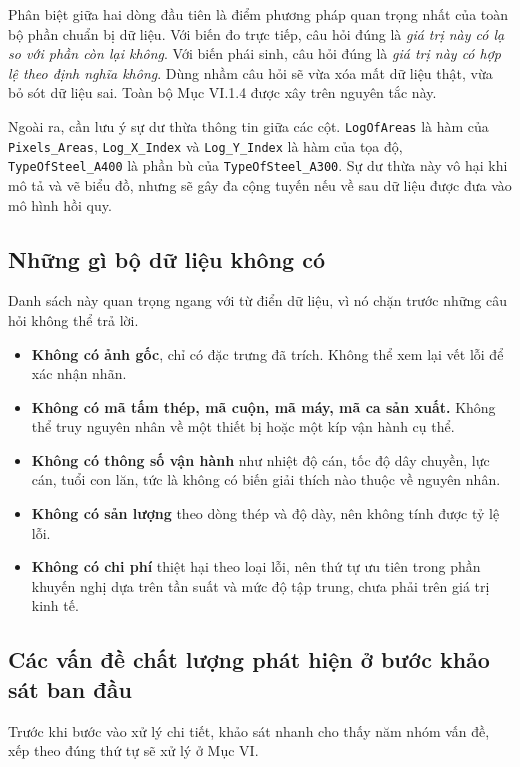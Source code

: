 \documentclass[12pt]{article}
\begin{document}
\noindent Phân biệt giữa hai dòng đầu tiên là điểm phương pháp quan trọng nhất của toàn bộ phần chuẩn bị dữ liệu. Với biến đo trực tiếp, câu hỏi đúng là \emph{giá trị này có lạ so với phần còn lại không}. Với biến phái sinh, câu hỏi đúng là \emph{giá trị này có hợp lệ theo định nghĩa không}. Dùng nhầm câu hỏi sẽ vừa xóa mất dữ liệu thật, vừa bỏ sót dữ liệu sai. Toàn bộ Mục VI.1.4 được xây trên nguyên tắc này.

\noindent Ngoài ra, cần lưu ý sự dư thừa thông tin giữa các cột. \texttt{LogOfAreas} là hàm của \texttt{Pixels\_Areas}, \texttt{Log\_X\_Index} và \texttt{Log\_Y\_Index} là hàm của tọa độ, \texttt{TypeOfSteel\_A400} là phần bù của \texttt{TypeOfSteel\_A300}. Sự dư thừa này vô hại khi mô tả và vẽ biểu đồ, nhưng sẽ gây đa cộng tuyến nếu về sau dữ liệu được đưa vào mô hình hồi quy.

\subsection{Những gì bộ dữ liệu không có}

Danh sách này quan trọng ngang với từ điển dữ liệu, vì nó chặn trước những câu hỏi không thể trả lời.

\begin{itemize}
  \item \textbf{Không có ảnh gốc}, chỉ có đặc trưng đã trích. Không thể xem lại vết lỗi để xác nhận nhãn.
  \item \textbf{Không có mã tấm thép, mã cuộn, mã máy, mã ca sản xuất.} Không thể truy nguyên nhân về một thiết bị hoặc một kíp vận hành cụ thể.
  \item \textbf{Không có thông số vận hành} như nhiệt độ cán, tốc độ dây chuyền, lực cán, tuổi con lăn, tức là không có biến giải thích nào thuộc về nguyên nhân.
  \item \textbf{Không có sản lượng} theo dòng thép và độ dày, nên không tính được tỷ lệ lỗi.
  \item \textbf{Không có chi phí} thiệt hại theo loại lỗi, nên thứ tự ưu tiên trong phần khuyến nghị dựa trên tần suất và mức độ tập trung, chưa phải trên giá trị kinh tế.
\end{itemize}

\subsection{Các vấn đề chất lượng phát hiện ở bước khảo sát ban đầu}

Trước khi bước vào xử lý chi tiết, khảo sát nhanh cho thấy năm nhóm vấn đề, xếp theo đúng thứ tự sẽ xử lý ở Mục VI.
\end{document}
